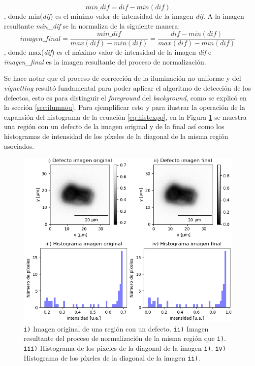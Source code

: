 \begin{itemize}
\begin{equation}
	\textit{min\_dif} = \textit{dif} - min(\textit{dif})
\end{equation},
donde min(\textit{dif}) es el mínimo valor de intensidad de la imagen \textit{dif}. A la imagen resultante \textit{min\_dif} se la normaliza de la siguiente manera:
\begin{equation}
	\textit{imagen\_final} = \frac{\textit{min\_dif}}{max(\textit{dif})-min(\textit{dif})} = \frac{\textit{dif} - min(\textit{dif})}{max(\textit{dif})-min(\textit{dif})}
	\label{eq:histexpp}
\end{equation},
donde max(\textit{dif}) es el máximo valor de intensidad de la imagen \textit{dif} e \textit{imagen\_final} es la imagen resultante del proceso de normalización.
\end{itemize}

Se hace notar que el proceso de corrección de la iluminación no uniforme y del \textit{vignetting} resultó fundamental para poder aplicar el algoritmo de detección de los defectos, esto es para distinguir el \textit{foreground} del \textit{background}, como se explicó en la sección \ref{sec:ilumnou}. Para ejemplificar esto y para ilustrar la operación de la expansión del histograma de la ecuación \ref{eq:histexpp}, en la Figura \ref{fig:defecthi} se muestra una región con un defecto de la imagen original y de la final así como los histogramas de intensidad de los píxeles de la diagonal de la misma región asociados.


\begin{figure}[H]
	\centering
	\includegraphics[scale=1.0]{Figs/defectosZEISS/correccionilum/defectoehist.png}
	\caption{\texttt{i)} Imagen original de una región con un defecto. \texttt{ii)} Imagen resultante del proceso de normalización de la misma región que \texttt{i)}. \texttt{iii)} Histograma de los píxeles de la diagonal de la imagen \texttt{i)}. \texttt{iv)} Histograma de los píxeles de la diagonal de la imagen \texttt{ii)}.}
	\label{fig:defecthi}
\end{figure}

